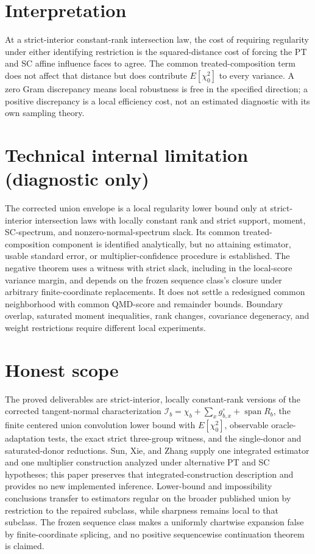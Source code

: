 \documentclass{article}
\begin{document}
\section{Interpretation}

At a strict-interior constant-rank intersection law, the cost of requiring regularity under either identifying restriction is the squared-distance cost of forcing the PT and SC affine influence faces to agree. The common treated-composition term does not affect that distance but does contribute \(E[\chi_0^2]\) to every variance. A zero Gram discrepancy means local robustness is free in the specified direction; a positive discrepancy is a local efficiency cost, not an estimated diagnostic with its own sampling theory.

\section*{Technical internal limitation (diagnostic only)}

The corrected union envelope is a local regularity lower bound only at strict-interior intersection laws with locally constant rank and strict support, moment, SC-spectrum, and nonzero-normal-spectrum slack. Its common treated-composition component is identified analytically, but no attaining estimator, usable standard error, or multiplier-confidence procedure is established. The negative theorem uses a witness with strict slack, including in the local-score variance margin, and depends on the frozen sequence class's closure under arbitrary finite-coordinate replacements. It does not settle a redesigned common neighborhood with common QMD-score and remainder bounds. Boundary overlap, saturated moment inequalities, rank changes, covariance degeneracy, and weight restrictions require different local experiments.

\section{Honest scope}

The proved deliverables are strict-interior, locally constant-rank versions of the corrected tangent-normal characterization \(\mathcal I_b=\chi_b+\sum_xg^{\circ}_{b,x}+\operatorname{span}R_b\), the finite centered union convolution lower bound with \(E[\chi_0^2]\), observable oracle-adaptation tests, the exact strict three-group witness, and the single-donor and saturated-donor reductions. Sun, Xie, and Zhang supply one integrated estimator and one multiplier construction analyzed under alternative PT and SC hypotheses; this paper preserves that integrated-construction description and provides no new implemented inference. Lower-bound and impossibility conclusions transfer to estimators regular on the broader published union by restriction to the repaired subclass, while sharpness remains local to that subclass. The frozen sequence class makes a uniformly chartwise expansion false by finite-coordinate splicing, and no positive sequencewise continuation theorem is claimed.
\end{document}
